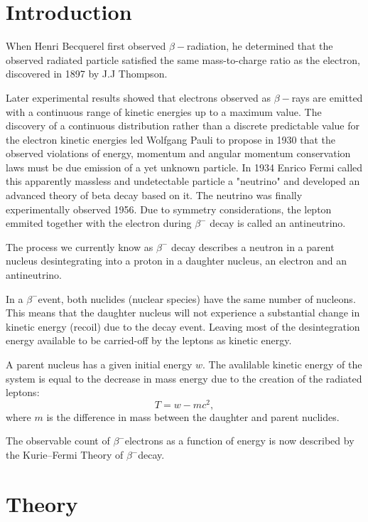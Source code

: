 \documentclass[12pt, a4paper]{article}
\begin{document}
\section{Introduction}
\begin{multicols}{2}
When Henri Becquerel first observed $\beta-$radiation, he determined that the observed radiated particle satisfied the same mass-to-charge ratio as the electron, discovered in 1897 by J.J Thompson\cite{Wikipedia-particle}. 

Later experimental results showed that electrons observed as $\beta-$rays are emitted with a continuous range of kinetic energies up to a maximum value\cite{SMM}. 
The discovery of a continuous distribution rather than a discrete predictable value for the electron kinetic energies led Wolfgang Pauli to propose in 1930 that the observed violations of energy, momentum and angular momentum conservation laws must be due emission of a yet unknown particle.
In 1934 Enrico Fermi called this apparently massless and undetectable particle a "neutrino" and developed an advanced theory of beta decay based on it. The neutrino was finally experimentally observed 1956.\cite{Nave-beta} Due to symmetry considerations, the lepton emmited together with the electron during $\beta^{-}$ decay is called an antineutrino.

The process we currently know as $\beta^{-}$ decay describes a neutron in a parent nucleus desintegrating into a proton in a daughter nucleus, an electron and an antineutrino.

In a $\beta^{-}$event, both nuclides (nuclear species) have the same number of nucleons. This means that the daughter nucleus will not experience a substantial change in kinetic energy (recoil) due to the decay event. Leaving most of the desintegration energy available to be carried-off by the leptons as kinetic energy. 

A parent nucleus has a given initial energy $w$. 
The avalilable kinetic energy of the system is equal to the decrease in mass energy due to the creation of the radiated leptons:
\begin{equation}T = w - m c^2,
\end{equation} where $m$ is the difference in mass between the daughter and parent nuclides.

The observable count of $\beta^{-}$electrons as a function of energy is now described by the Kurie--Fermi Theory of $\beta^{-}$decay.

\section{Theory}


\end{multicols}
\end{document}
